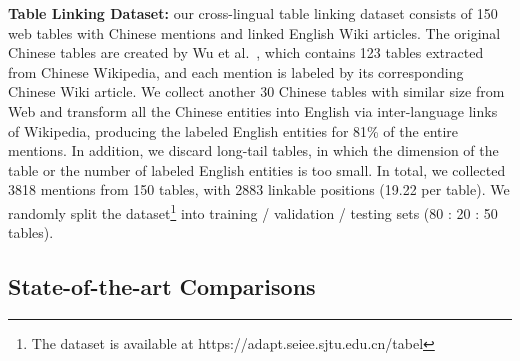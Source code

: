 \noindent
\textbf{Table Linking Dataset:}
our cross-lingual table linking dataset consists of 150 web tables with
Chinese mentions and linked English Wiki articles.
The original Chinese tables are created by Wu et al.~,
which contains 123 tables extracted from Chinese Wikipedia, and each mention is labeled by
its corresponding Chinese Wiki article.
We collect another 30 Chinese tables with similar size from Web and
transform all the Chinese entities into English via inter-language links of Wikipedia,
producing the labeled English entities for 81\% of the entire mentions.
In addition, we discard long-tail tables,
in which the dimension of the table or the number of labeled English 
entities is too small.
In total, we collected 3818 mentions from 150 tables, with 2883 linkable positions
(19.22 per table).
We randomly split the dataset\footnote{The dataset is available at https://adapt.seiee.sjtu.edu.cn/tabel} into training / validation / testing sets (80 : 20 : 50 tables).




\subsection{State-of-the-art Comparisons}
\label{exp:soat}

